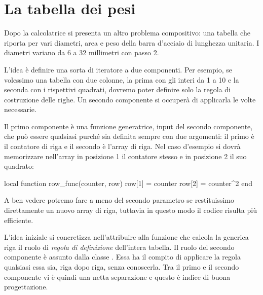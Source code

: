 
\section{La tabella dei pesi}

Dopo la calcolatrice si presenta un altro problema compositivo: una tabella che
riporta per vari diametri, area e peso della barra d'acciaio di lunghezza
unitaria. I diametri variano da 6 a 32 millimetri con passo 2.

L'idea è definire una sorta di iteratore a due componenti. Per esempio, se
volessimo una tabella con due colonne, la prima con gli interi da 1 a 10 e la
seconda con i rispettivi quadrati, dovremo poter definire solo la regola di
costruzione delle righe. Un secondo componente si occuperà di applicarla le
volte necessarie.

Il primo componente è una funzione generatrice, input del secondo componente,
che può essere qualsiasi purché sia definita sempre con due argomenti: il primo
è il contatore di riga e il secondo è l'array di riga. Nel caso d'esempio si
dovrà memorizzare nell'array in posizione 1 il contatore stesso e in posizione 2
il suo quadrato:
\begin{lines}
local function row_func(counter, row)
    row[1] = counter
    row[2] = counter^2
end
\end{lines}

A ben vedere potremo fare a meno del secondo parametro  se
restituissimo direttamente un nuovo array di riga, tuttavia in questo modo il
codice risulta più efficiente.

L'idea iniziale si concretizza nell'attribuire alla funzione che calcola la
generica riga il ruolo di \emph{regola di definizione} dell'intera tabella.
Il ruolo del secondo componente è assunto dalla classe . Essa ha il
compito di applicare la regola qualsiasi essa sia, riga dopo riga, senza
conoscerla. Tra il primo e il secondo componente vi è quindi una netta
separazione e questo è indice di buona progettazione.


